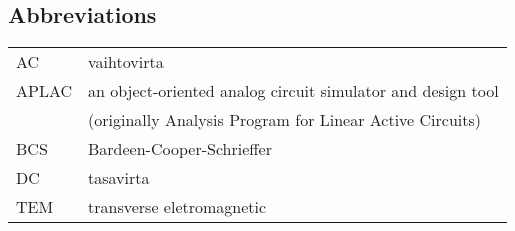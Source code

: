 \subsection*{Abbreviations}

\begin{tabular}{ll}
AC         & vaihtovirta \\
APLAC      & an object-oriented analog circuit simulator and design tool \\
           & (originally Analysis Program for Linear Active Circuits) \\
BCS        & Bardeen-Cooper-Schrieffer \\ %
DC         & tasavirta \\
TEM        & transverse eletromagnetic
\end{tabular}